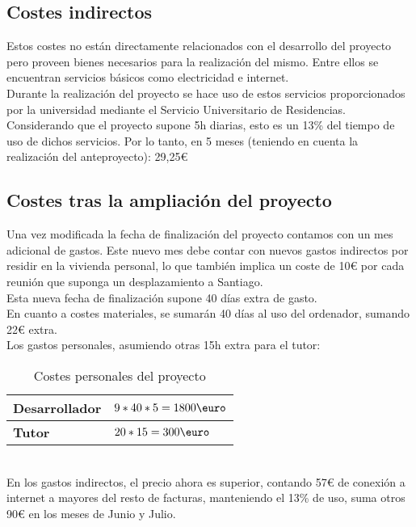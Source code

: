 \subsection{Costes indirectos}

Estos costes no están directamente relacionados con el desarrollo del proyecto pero proveen bienes necesarios para la realización del mismo. Entre ellos se encuentran servicios básicos como electricidad e internet.\\

Durante la realización del proyecto se hace uso de estos servicios proporcionados por la universidad mediante el Servicio Universitario de Residencias. \\

Considerando que el proyecto supone 5h diarias, esto es un 13\% del tiempo de uso de dichos servicios. Por lo tanto, en 5 meses (teniendo en cuenta la realización del anteproyecto): 29,25{\euro}

\subsection{Costes tras la ampliación del proyecto}

Una vez modificada la fecha de finalización del proyecto contamos con un mes adicional de gastos. Este nuevo mes debe contar con nuevos gastos indirectos por residir en la vivienda personal, lo que también implica un coste de 10{\euro} por cada reunión que suponga un desplazamiento a Santiago.\\

Esta nueva fecha de finalización supone 40 días extra de gasto. \\

En cuanto a costes materiales, se sumarán 40 días al uso del ordenador, sumando 22{\euro} extra.\\

Los gastos personales, asumiendo otras 15h extra para el tutor:\\

\begin{table} [H]
    \begin{tabularx}{\linewidth}{|p{3cm}|X|}
        \hline
        \textbf{Desarrollador} & $9*40*5=1800\mbox{\euro}$ \tabularnewline
        \hline
        \textbf{Tutor} & $20*15=300\mbox{\euro}$ \tabularnewline
        \hline
    \end{tabularx}
    \caption{Costes personales del proyecto}
    \label{tab:costes-personales}
\end{table}
\ \\
En los gastos indirectos, el precio ahora es superior, contando 57{\euro} de conexión a internet a mayores del resto de facturas, manteniendo el 13\% de uso, suma otros 90{\euro} en los meses de Junio y Julio.\\

